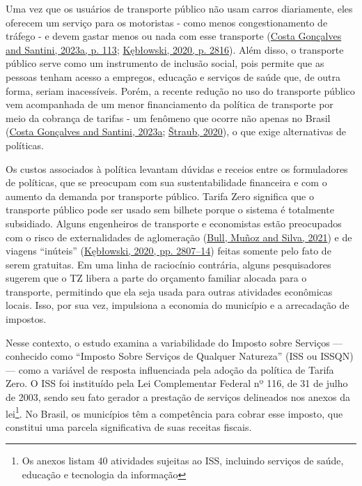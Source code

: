 \documentclass[12pt, a4paper, twoside]{article}
\numberwithin{equation}{subsection} %
\begin{document}
Uma vez que os usuários de transporte público não usam carros
diariamente, eles oferecem um serviço para os motoristas - como menos
congestionamento de tráfego - e devem gastar menos ou nada com esse
transporte
(\protect\hyperlink{ref-Costa_Gonuxe7alves_Santini_2023}{Costa Gonçalves
and Santini, 2023a, p. 113};
\protect\hyperlink{ref-keblowski_why_2020}{Kębłowski, 2020, p. 2816}).
Além disso, o transporte público serve como um instrumento de inclusão
social, pois permite que as pessoas tenham acesso a empregos, educação e
serviços de saúde que, de outra forma, seriam inacessíveis. Porém, a
recente redução no uso do transporte público vem acompanhada de um menor
financiamento da política de transporte por meio da cobrança de tarifas
- um fenômeno que ocorre não apenas no Brasil
(\protect\hyperlink{ref-Costa_Gonuxe7alves_Santini_2023}{Costa Gonçalves
and Santini, 2023a}; \protect\hyperlink{ref-straub_2020}{Štraub, 2020}),
o que exige alternativas de políticas.

Os custos associados à política levantam dúvidas e receios entre os
formuladores de políticas, que se preocupam com sua sustentabilidade
financeira e com o aumento da demanda por transporte público. Tarifa
Zero significa que o transporte público pode ser usado sem bilhete
porque o sistema é totalmente subsidiado. Alguns engenheiros de
transporte e economistas estão preocupados com o risco de externalidades
de aglomeração (\protect\hyperlink{ref-BULL-RCT-2021}{Bull, Muñoz and
Silva, 2021}) e de viagens ``inúteis''
(\protect\hyperlink{ref-keblowski_why_2020}{Kębłowski, 2020, pp.
2807--14}) feitas somente pelo fato de serem gratuitas. Em uma linha de
raciocínio contrária, alguns pesquisadores sugerem que o TZ libera a
parte do orçamento familiar alocada para o transporte, permitindo que
ela seja usada para outras atividades econômicas locais. Isso, por sua
vez, impulsiona a economia do município e a arrecadação de impostos.

Nesse contexto, o estudo examina a variabilidade do Imposto sobre
Serviços --- conhecido como ``Imposto Sobre Serviços de Qualquer
Natureza'' (ISS ou ISSQN) --- como a variável de resposta influenciada
pela adoção da política de Tarifa Zero. O ISS foi instituído pela Lei
Complementar Federal nº 116, de 31 de julho de 2003, sendo seu fato
gerador a prestação de serviços delineados nos anexos da lei\footnote{Os
  anexos listam 40 atividades sujeitas ao ISS, incluindo serviços de
  saúde, educação e tecnologia da informação}. No Brasil, os municípios
têm a competência para cobrar esse imposto, que constitui uma parcela
significativa de suas receitas fiscais.
\end{document}
